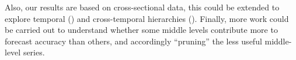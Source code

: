 \documentclass[a4paper,review,12pt,authoryear]{elsarticle}
\begin{document}
Also, our results are based on cross-sectional data, this could be extended to explore temporal (\citealp{athanasopoulosForecastingTemporalHierarchies2017}) and cross-temporal hierarchies (\citealp{girolimettoCrosstemporalProbabilisticForecast2023a}). Finally, more work could be carried out to understand whether some middle levels contribute more to forecast accuracy than others, and accordingly ``pruning'' the less useful middle-level series.\\








\begingroup
{}


\endgroup
\end{document}
